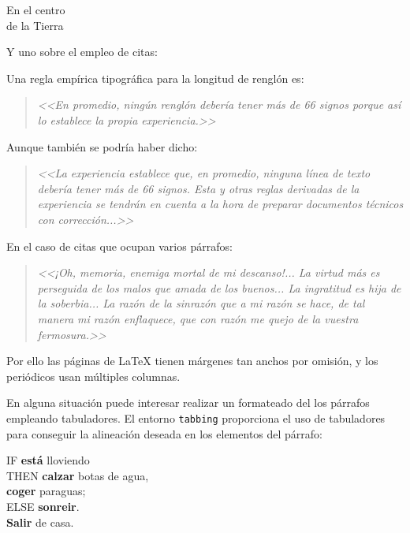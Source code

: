 \documentclass[11pt,a4paper]{article}
\begin{document}
\begin{center}
	En el centro\\
	de la Tierra
\end{center}


\noindent Y uno sobre el empleo de citas:

Una regla empírica tipográfica para la longitud de renglón es:

\begin{quote}
\emph{<<En promedio, ningún renglón debería tener más de 66 signos porque así lo establece la propia experiencia.>>}
\end{quote}


Aunque también se podría haber dicho:


\begin{quote}
\emph{<<La experiencia establece que, en promedio, ninguna línea de texto debería tener más de 66 signos. Esta y otras reglas derivadas de la experiencia se tendrán en cuenta a la hora de preparar documentos técnicos con corrección...>>}
\end{quote}

En el caso de citas que ocupan varios párrafos:


\begin{quotation}
{\em <<¡Oh, memoria, enemiga mortal de mi descanso!...
La virtud más es perseguida de los malos que amada de los buenos...
La ingratitud es hija de la soberbia...
La razón de la sinrazón que a mi razón se hace, de tal manera mi razón enflaquece, que con razón me quejo de la vuestra fermosura.>>}
\end{quotation}

Por ello las páginas de \LaTeX{} tienen márgenes tan anchos por omisión, y los periódicos usan múltiples columnas. 

En alguna situación puede interesar realizar un formateado del los párrafos empleando tabuladores. El entorno \texttt{tabbing} proporciona el uso de tabuladores para conseguir la alineación deseada en los elementos del párrafo:





\begin{tabbing}
IF	\= \textbf{está} lloviendo                \\
    \> THEN \= \textbf{calzar} botas de agua, \\
    \>      \> \textbf{coger} paraguas;       \\
    \> ELSE \> \textbf{sonreir}.              \\
\textbf{Salir} de casa.
\end{tabbing}
\end{document}
